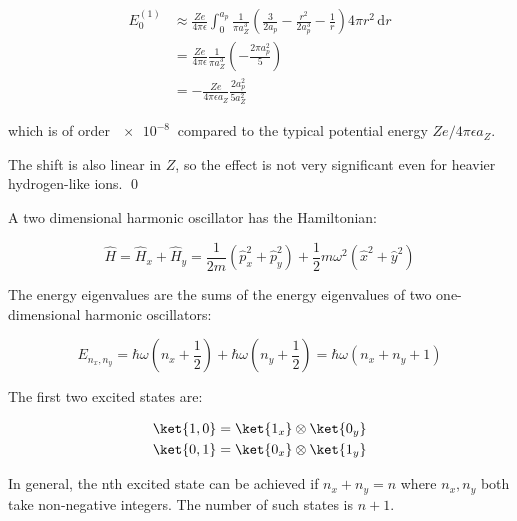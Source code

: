\documentclass[12pt]{article}
\begin{document}
\begin{equation}
    \begin{split}
        E_{0}^{(1)} &\approx \frac{Ze}{4\pi\epsilon} \int_{0}^{a_{p}} \frac{1}{\pi a_{Z}^{3}} \left( \frac{3}{2a_{p}} - \frac{r^{2}}{2a_{p}^{3}} - \frac{1}{r} \right) 4\pi r^{2} \, \mathrm{d}r \\
        &= \frac{Ze}{4\pi\epsilon} \frac{1}{\pi a_{Z}^{3}} \left( -\frac{2\pi a_{p}^{2}}{5} \right) \\
        &= -\frac{Ze}{4\pi\epsilon a_{Z}} \frac{2a_{p}^{2}}{5a_{Z}^{2}}
    \end{split}
\end{equation}

which is of order $\qty{e-8}{}$ compared to the typical potential energy $Ze/4\pi\epsilon a_{Z}$.

The shift is also linear in $Z$, so the effect is not very significant even for heavier hydrogen-like ions.
\qed


A two dimensional harmonic oscillator has the Hamiltonian:

\begin{equation}
    \hat{H} = \hat{H}_{x} + \hat{H}_{y} = \frac{1}{2m} \left( \hat{p}_{x}^{2} + \hat{p}_{y}^{2} \right) + \frac{1}{2} m\omega^{2} \left( \hat{x}^{2} + \hat{y}^{2} \right)
\end{equation}

The energy eigenvalues are the sums of the energy eigenvalues of two one-dimensional harmonic oscillators:

\begin{equation}
    E_{n_{x}, n_{y}} = \hbar \omega \left( n_{x} + \frac{1}{2} \right) + \hbar \omega \left( n_{y} + \frac{1}{2} \right) = \hbar \omega \left( n_{x} + n_{y} + 1 \right)
\end{equation}

The first two excited states are:

\begin{equation}
    \begin{split}
        \ket{1, 0} &= \ket{1_{x}} \otimes \ket{0_{y}} \\
        \ket{0, 1} &= \ket{0_{x}} \otimes \ket{1_{y}}
    \end{split}
\end{equation}

In general, the nth excited state can be achieved if $n_{x} + n_{y} = n$ where $n_{x}, n_{y}$ both take non-negative integers. The number of such states is $n+1$.
\end{document}
